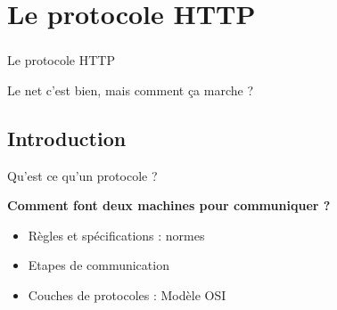 

\section{Le protocole HTTP}
\begin{frame}\frametitle{}
    {\Huge Le protocole HTTP}

    \vspace{2em}

    Le net c'est bien, mais comment ça marche ?
\end{frame}



\subsection{Introduction}

\begin{frame}{Qu'est ce qu'un protocole ?}


\textbf{\huge Comment font deux machines pour communiquer ?} \\

\vspace{1em}
		
\begin{itemize}

	\item Règles et spécifications : normes
	\item Etapes de communication
	\item Couches de protocoles : Modèle OSI

\end{itemize}




\end{frame}{}

